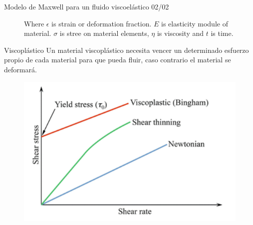 \begin{frame}{Modelo de Maxwell para un fluido viscoelástico 02/02}
\begin{figure}
\centering
{}
\caption{Where $ \epsilon $ is strain or deformation fraction. $E$ is elasticity module of material. $ \sigma $ is stree on material elements, $ \eta $ is viscosity and $ t $ is time.}
\label{f:casolagrangiano}
\end{figure}
\end{frame}

\begin{frame}{Viscoplástico}
\justifying
Un material viscoplástico necesita vencer un determinado esfuerzo propio de cada material para que pueda fluir, caso contrario el material se deformará.
\begin{figure}[H]
\centering
\includegraphics[scale=0.4]{Section_Files/S2-imagenes-Manuel/22.png}
\end{figure}
\end{frame}


